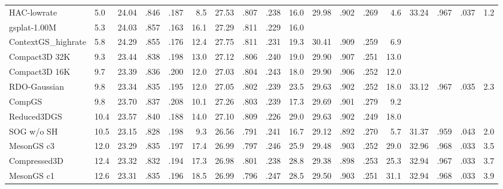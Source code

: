 {\begin{minipage}{\textheight}
\begin{adjustbox}{center}
\begin{tabular}{ll|lllr|lllr|lllr|lllr}
HAC-lowrate & 5.0 & 24.04 & .846 & .187 & \cellcolor{lightorange}8.5 & 27.53 & .807 & .238 & \cellcolor{lightyellow}16.0 & 29.98 & .902 & .269 & \cellcolor{lightorange}4.6 & 33.24 & \cellcolor{lightorange}.967 & .037 & \cellcolor{lightred}1.2 \\
gsplat-1.00M & 5.3 & 24.03 & \cellcolor{lightred}.857 & \cellcolor{lightred}.163 & 16.1 & 27.29 & \cellcolor{lightorange}.811 & \cellcolor{lightyellow}.229 & \cellcolor{lightyellow}16.0 &  &  &  &  &  &  &  &  \\
ContextGS_highrate & 5.8 & \cellcolor{lightorange}24.29 & \cellcolor{lightorange}.855 & \cellcolor{lightorange}.176 & 12.4 & \cellcolor{lightorange}27.75 & \cellcolor{lightorange}.811 & .231 & 19.3 & \cellcolor{lightred}30.41 & \cellcolor{lightorange}.909 & .259 & 6.9 &  &  &  &  \\
Compact3D 32K & 9.3 & 23.44 & .838 & .198 & 13.0 & 27.12 & .806 & .240 & 19.0 & 29.90 & \cellcolor{lightyellow}.907 & .251 & 13.0 &  &  &  &  \\
Compact3D 16K & 9.7 & 23.39 & .836 & .200 & 12.0 & 27.03 & .804 & .243 & 18.0 & 29.90 & .906 & .252 & 12.0 &  &  &  &  \\
RDO-Gaussian & 9.8 & 23.34 & .835 & .195 & 12.0 & 27.05 & .802 & .239 & 23.5 & 29.63 & .902 & .252 & 18.0 & 33.12 & \cellcolor{lightorange}.967 & \cellcolor{lightyellow}.035 & \cellcolor{lightyellow}2.3 \\
CompGS & 9.8 & 23.70 & .837 & .208 & 10.1 & 27.26 & .803 & .239 & 17.3 & 29.69 & .901 & .279 & 9.2 &  &  &  &  \\
Reduced3DGS & 10.4 & 23.57 & .840 & .188 & 14.0 & 27.10 & .809 & \cellcolor{lightorange}.226 & 29.0 & 29.63 & .902 & \cellcolor{lightorange}.249 & 18.0 &  &  &  &  \\
SOG w/o SH & 10.5 & 23.15 & .828 & .198 & \cellcolor{lightyellow}9.3 & 26.56 & .791 & .241 & 16.7 & 29.12 & .892 & .270 & \cellcolor{lightyellow}5.7 & 31.37 & .959 & .043 & \cellcolor{lightorange}2.0 \\
MesonGS c3 & 12.0 & 23.29 & .835 & .197 & 17.4 & 26.99 & .797 & .246 & 25.9 & 29.48 & .903 & .252 & 29.0 & 32.96 & \cellcolor{lightred}.968 & \cellcolor{lightred}.033 & 3.5 \\
Compressed3D & 12.4 & 23.32 & .832 & .194 & 17.3 & 26.98 & .801 & .238 & 28.8 & 29.38 & .898 & .253 & 25.3 & 32.94 & \cellcolor{lightorange}.967 & \cellcolor{lightred}.033 & 3.7 \\
MesonGS c1 & 12.6 & 23.31 & .835 & .196 & 18.5 & 26.99 & .796 & .247 & 28.5 & 29.50 & .903 & .251 & 31.1 & 32.94 & \cellcolor{lightred}.968 & \cellcolor{lightred}.033 & 3.9 \\

\end{tabular}
\end{adjustbox}
\end{minipage}}
